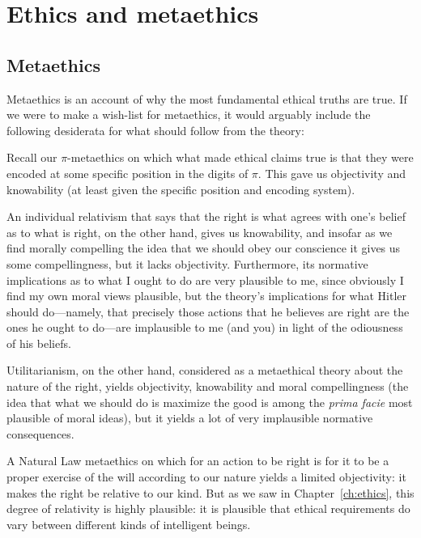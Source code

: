 \def\mychapter{III}
\chapter{Ethics and metaethics}\label{ch:meta}
\section{Metaethics}
Metaethics is an account of why the most fundamental ethical truths are true. If we were to make a wish-list
for metaethics, it would arguably include the following desiderata for what should follow from the theory:

Recall our $\pi$-metaethics on which what made ethical claims true is that they were encoded at some
specific position in the digits of $\pi$. This gave us objectivity and knowability (at least given
the specific position and encoding system).

An individual relativism
that says that the right is what agrees with one's belief as to what is right,  on the
other hand, gives us knowability, and insofar as we find morally compelling the idea that we should obey
our conscience it gives us some compellingness, but it lacks objectivity. Furthermore, its normative implications as to
what I ought to do are very plausible to me, since obviously I find my own moral views plausible, but the theory's implications
for what Hitler should do---namely, that precisely those actions that he believes are right are the ones he ought to do---are implausible
to me (and you) in light of the odiousness of his beliefs.

Utilitarianism, on the other hand, considered as a  metaethical theory about the nature of the right, yields objectivity, knowability
and moral compellingness (the idea that what we should do is maximize the good is among the \textit{prima facie} most plausible of moral ideas), but
it yields a lot of very implausible normative consequences.

A Natural Law metaethics on which for an action to be right is for it to be a proper exercise of the will according to our nature
yields a limited objectivity: it makes the right be relative to our kind. But as we saw in Chapter~\ref{ch:ethics}, this degree
of relativity is highly plausible: it is plausible that ethical requirements do vary between different kinds of intelligent
beings.

